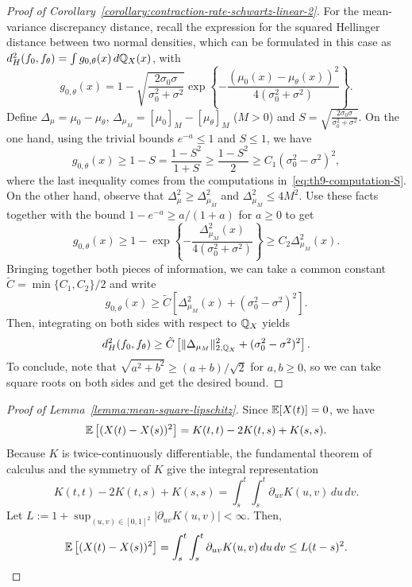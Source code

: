 \begin{proof}[Proof of Corollary~\ref{corollary:contraction-rate-schwartz-linear-2}]
For the mean-variance discrepancy distance, recall the expression for the squared Hellinger distance between two normal densities, which can be formulated in this case as \(d^2_H(f_0, f_\theta)= \int g_{0,\theta}(x)\, d\mathbb{Q}_X(x)\), with
\[
  g_{0,\theta}(x) = 1 - \sqrt{\frac{2\sigma_0\sigma}{\sigma_0^2 + \sigma^2}}\exp\left\{ -\frac{(\mu_0(x) - \mu_{\theta}(x))^2}{4(\sigma_0^2 + \sigma^2)} \right\}.
\]
Define \(\Delta_\mu = \mu_0-\mu_\theta\), \(\Delta_{\mu_M} = [\mu_0]_M - [\mu_\theta]_M\) (\(M>0\)) and \(S=\sqrt{\frac{2\sigma_0\sigma}{\sigma_0^2+\sigma^2}}\). On the one hand, using the trivial bounds \(e^{-a}\leq 1\) and \(S\leq 1\), we have
\[
  g_{0,\theta}(x) \geq 1 - S = \frac{1-S^2}{1+S} \geq \frac{1-S^2}{2} \geq C_1(\sigma_0^2 - \sigma^2)^2,
\]
where the last inequality comes from the computations in~\eqref{eq:th9-computation-S}. On the other hand, observe that \(\Delta^2_\mu \geq \Delta^2_{\mu_M}\) and \(\Delta^2_{\mu_M}\leq 4M^2\). Use these facts together with the bound \(1-e^{-a}\geq a/(1+a)\) for \(a\geq 0\) to get
\[
  g_{0,\theta}(x)  \geq  1 - \exp\left\{ -\frac{\Delta^2_{\mu_M}(x)}{4(\sigma_0^2+\sigma^2)} \right\} \geq C_2\Delta^2_{\mu_M}(x).
\]
Bringing together both pieces of information, we can take a common constant \(\tilde C = \min\{C_1, C_2\}/2\) and write
\[
  g_{0,\theta}(x) \geq \tilde C\left[\Delta^2_{\mu_M}(x) + (\sigma_0^2 - \sigma^2)^2\right].
\]
Then, integrating on both sides with respect to \(\mathbb{Q}_X\) yields
\[
  d_H^2(f_0, f_\theta)\geq \tilde C\left[\|\Delta_{\mu_M}\|^2_{2,\mathbb{Q}_X} + (\sigma_0^2 - \sigma^2)^2\right].
\]
To conclude, note that \(\sqrt{a^2+b^2}\geq (a+b)/\sqrt{2}\) for \(a,b\geq 0\), so we can take square roots on both sides and get the desired bound.
\end{proof}

\begin{proof}[Proof of Lemma~\ref{lemma:mean-square-lipschitz}]\label{proof:mean-square-lipschitz}
Since \(\mathbb{E}[X(t)]=0\), we have 
\[
  \mathbb{E}\left[(X(t) - X(s))^2\right] = K(t,t)-2K(t,s) + K(s,s).
\]
Because \(K\) is twice-continuously differentiable, the fundamental theorem of calculus and the symmetry of \(K\) give the integral representation
\[
  K(t,t)-2K(t,s) + K(s,s) = \int_s^t \int_s^t \partial_{uv}K(u, v)\, du\, dv.
\]
Let \(L := 1 + \sup_{(u, v) \in [0,1]^2} |\partial_{uv}K(u, v)|<\infty\). Then,
\[
  \mathbb{E}\left[(X(t) - X(s))^2\right] = \int_s^t \int_s^t \partial_{uv}K(u, v)\, du\, dv \leq  L(t-s)^2.
\]
\end{proof}



